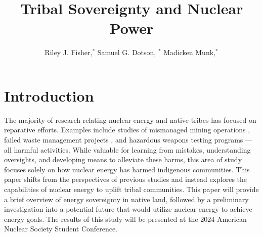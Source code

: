 \documentclass{anstrans}
\title{Tribal Sovereignty and Nuclear Power}
\author{Riley J. Fisher,$^{*}$ Samuel G. Dotson, $^{*}$ Madicken Munk,$^{*}$}
\institute{ $^{*}$Dept. of Nuclear, Plasma, and Radiological Engineering,
University of Illinois at Urbana-Champaign, Urbana, IL 61801 }
\begin{document}


\section{Introduction}
The majority of research relating nuclear energy and native tribes has focused
on reparative efforts. Examples include studies of mismanaged mining operations
\cite{hoover_elevated_2017}, failed waste management projects
\cite{endres_sacred_2012}, and hazardous weapons testing programs
\cite{frohmberg_assessment_2000} --- all harmful activities. While valuable for
learning from mistakes, understanding oversights, and developing means to
alleviate these harms, this area of study focuses solely on how nuclear energy
has harmed indigenous communities. This paper shifts from the perspectives of
previous studies and instead explores the capabilities of nuclear energy to
uplift tribal communities. This paper will provide a brief overview of energy
sovereignty in native land, followed by a preliminary investigation into a
potential future that would utilize nuclear energy to achieve energy goals. The
results of this study will be presented at the 2024 American Nuclear Society
Student Conference. 
\end{document}

